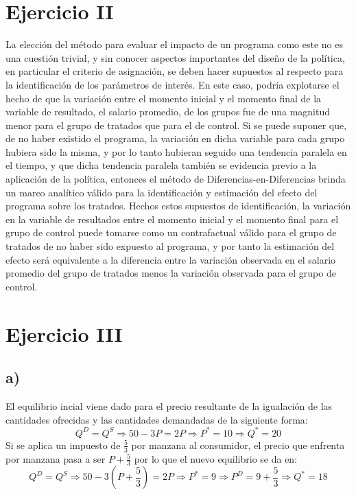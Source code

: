 \documentclass[12pt,a4paper,notitlepage]{article}
\begin{document}
\section*{Ejercicio II}
\noindent La elección del método para evaluar el impacto de un programa como este no es una cuestión trivial, y sin conocer aspectos importantes del diseño de la política, en particular el criterio de asignación, se deben hacer supuestos al respecto para la identificación de los parámetros de interés. En este caso, podría explotarse el hecho de que la variación entre el momento inicial y el momento final de la variable de resultado, el salario promedio, de los grupos fue de una magnitud menor para el grupo de tratados que para el de control. Si se puede suponer que, de no haber existido el programa, la variación en dicha variable para cada grupo hubiera sido la misma, y por lo tanto hubieran seguido una tendencia paralela en el tiempo, y que dicha tendencia paralela también se evidencia previo a la aplicación de la política, entonces el método de Diferencias-en-Diferencias brinda un marco analítico válido para la identificación y estimación del efecto del programa sobre los tratados. Hechos estos supuestos de identificación, la variación en la variable de resultados entre el momento inicial y el momento final para el grupo de control puede tomarse como un contrafactual válido para el grupo de tratados de no haber sido expuesto al programa, y por tanto la estimación del efecto será equivalente a la diferencia entre la variación observada en el salario promedio del grupo de tratados menos la variación observada para el grupo de control.\\

\section*{Ejercicio III} 
\subsection*{a)}
El equilibrio incial viene dado para el precio resultante de la igualación de las cantidades ofrecidas y las cantidades demandadas de la siguiente forma:
\begin{equation}
Q ^{D}=Q^{S} \Rightarrow 50-3P=2P \Rightarrow P^{*}=10 \Rightarrow Q^{*}=20
\end{equation}
Si se aplica un impuesto de $\frac{5}{3}$ por manzana al consumidor, el precio que enfrenta por manzana pasa a ser $P+\frac{5}{3}$ por lo que el nuevo equilibrio se da en:
\begin{equation}
Q ^{D}=Q^{S} \Rightarrow 50-3(P+\frac{5}{3})=2P \Rightarrow P^{*}=9 \Rightarrow P^{D}=9+\frac{5}{3} \Rightarrow Q^{*}=18
\end{equation}\\
\end{document}
